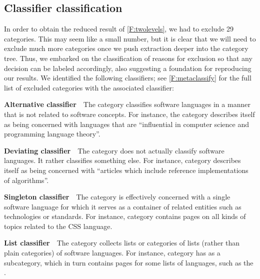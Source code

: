 
\subsection{Classifier classification}

In order to obtain the reduced result of \autoref{F:twolevels}, we had to exclude 29 categories. This may seem like a small number, but it is clear that we will need to exclude much more categories once we push extraction deeper into the category tree. Thus, we embarked on the classification of reasons for exclusion so that any decision can be labeled accordingly, also suggesting a foundation for reproducing our results. We identified the following classifiers; see \autoref{F:metaclassify} for the full list of excluded categories with the associated classifier:

\medskip

\noindent
\textbf{Alternative classifier}\ \ The category classifies software languages in a manner that is not related to software concepts. For instance, the category  describes itself as being concerned with languages that are ``influential in computer science and programming language theory''.

\smallskip

\noindent
\textbf{Deviating classifier}\ \ The category does not actually classify software languages. It rather classifies something else. For instance, category  describes itself as being concerned with ``articles which include reference implementations of algorithms''.

\smallskip

\noindent
\textbf{Singleton classifier}\ \ The category is effectively concerned with a single software language for which it serves as a container of related entities such as technologies or standards. For instance, category  contains pages on all kinds of topics related to the CSS language.

\smallskip

\noindent
\textbf{List classifier}\ \ The category collects lists or categories of lists (rather than plain categories) of software languages. For instance, category  has  as a subcategory, which in turn contains pages for some lists of languages, such as the .

